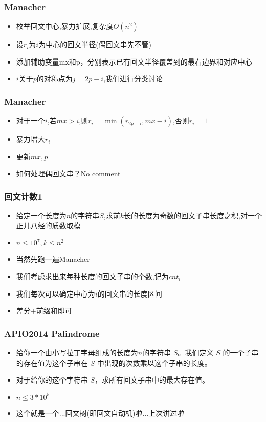 \documentclass[notheorems]{beamer}
\begin{document}
\begin{frame}
\frametitle{Manacher}
\begin{itemize}[]
\item 枚举回文中心,暴力扩展,复杂度$O(n^2)$
\pause
\item 设$r_i$为$i$为中心的回文半径(偶回文串先不管)
\item 添加辅助变量mx和p，分别表示已有回文半径覆盖到的最右边界和对应中心
\pause
\item $i$关于$p$的对称点为$j=2p-i$,我们进行分类讨论
\end{itemize}
\end{frame}

\begin{frame}
\frametitle{Manacher}
\begin{itemize}[]
\item 对于一个$i$,若$mx > i$,则$r_i = \min(r_{2p-i},mx-i)$,否则$r_i = 1$
\pause
\item 暴力增大$r_i$
\pause
\item 更新$mx,p$
\pause
\item 如何处理偶回文串？No comment
\end{itemize}
\end{frame}

\begin{frame}
\frametitle{回文计数1}
\begin{itemize}
\item 给定一个长度为$n$的字符串$S$,求前$k$长的长度为奇数的回文子串长度之积,对一个正儿八经的质数取模
\item $n\leq 10^7,k\leq n^2$
\pause
\item 当然先跑一遍Manacher
\pause
\item 我们考虑求出来每种长度的回文子串的个数,记为$cnt_i$
\pause
\item 我们每次可以确定中心为$i$的回文串的长度区间
\pause
\item 差分+前缀和即可
\end{itemize}
\end{frame}


\begin{frame}
\frametitle{APIO2014 Palindrome}
\begin{itemize}
\item 给你一个由小写拉丁字母组成的长度为$n$的字符串 $S$。我们定义 $S$ 的一个子串的存在值为这个子串在 $S$ 中出现的次数乘以这个子串的长度。
\item 对于给你的这个字符串 $S$，求所有回文子串中的最大存在值。
\item $n\leq 3*10^5$
\pause
\item 这个就是一个...回文树(即回文自动机)啦...上次讲过啦
\end{itemize}
\end{frame}
\end{document}
